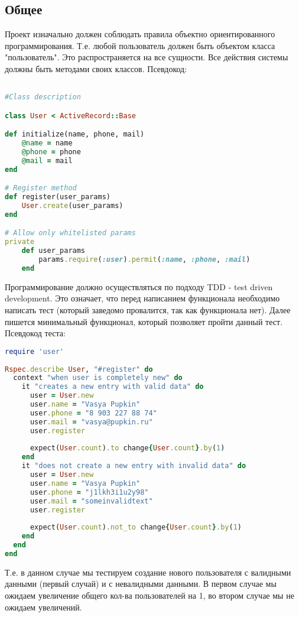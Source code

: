 \documentclass[DIV=calc, paper=a4, fontsize=11pt]{scrartcl} %
\begin{document}
\subsection{Общее}

Проект изначально должен соблюдать правила объектно ориентированного программирования. Т.е. любой пользователь должен быть объектом класса "пользователь". Это распространяется на все сущности. Все действия системы должны быть методами своих классов. Псевдокод:
\begin{lstlisting}[language=Ruby]

#Class description

class User < ActiveRecord::Base 

def initialize(name, phone, mail)
	@name = name
	@phone = phone
	@mail = mail
end

# Register method
def register(user_params)
	User.create(user_params)
end

# Allow only whitelisted params
private
	def user_params
		params.require(:user).permit(:name, :phone, :mail)
	end
\end{lstlisting}

Программирование должно осуществляться по подходу TDD - test driven development. Это означает, что перед написанием функционала необходимо написать тест (который заведомо провалится, так как функционала нет). Далее пишется минимальный функционал, который позволяет пройти данный тест.
\\[0.5cm]
Псевдокод теста:
\begin{lstlisting}[language=Ruby]
require 'user'
	
Rspec.describe User, "#register" do
  context "when user is completely new" do
	it "creates a new entry with valid data" do
	  user = User.new
      user.name = "Vasya Pupkin"
	  user.phone = "8 903 227 88 74"
	  user.mail = "vasya@pupkin.ru"
	  user.register
				
	  expect(User.count).to change{User.count}.by(1)
	end
    it "does not create a new entry with invalid data" do
      user = User.new
	  user.name = "Vasya Pupkin"
	  user.phone = "j1lkh3i1u2y98"
	  user.mail = "someinvalidtext"
	  user.register	
		
      expect(User.count).not_to change{User.count}.by(1)
	end
  end
end
\end{lstlisting}
Т.е. в данном случае мы тестируем создание нового пользователя с валидными данными (первый случай) и с невалидными данными. В первом случае мы ожидаем увеличение общего кол-ва пользователей на 1, во втором случае мы не ожидаем увеличений.
\end{document}
